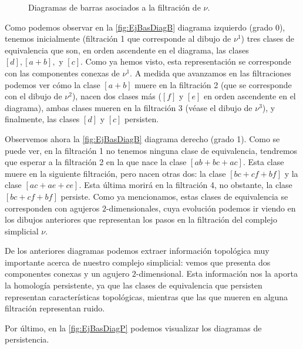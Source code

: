\documentclass[12pt, a4paper, twoside]{book}
\numberwithin{equation}{section}
\theoremstyle{definition}
\newenvironment{ejem}
  {\pushQED{\qed}\renewcommand{\qedsymbol}{$\blacktriangleleft$}\ejemplo}
  {\popQED\endejemplo}
\theoremstyle{remark}
\theoremstyle{plain}
\begin{document}
\begin{ejem}
\begin{figure}[!htbp]
{\begin{figure}[H]
{}
			\end{figure}	
		\endminipage}
		\caption{Diagramas de barras asociados a la filtración de 
		{\Large $\nu$}.}
		\label{fig:EjBasDiagB}
	\end{figure}

	Como podemos observar en la \autoref{fig:EjBasDiagB} diagrama 
	izquierdo (grado 0), 
	tenemos inicialmente (filtración 1 que corresponde al dibujo de 
	{\Large $\nu$}$^{1}$) tres clases de equivalencia que son, en orden 
	ascendente 
	en el diagrama, las clases $[d],[a+b],$ y $[c]$. Como ya hemos visto, 
	esta representación se corresponde con las componentes conexas de 
	{\Large $\nu$}$^{1}$. A medida que avanzamos en las 
	filtraciones podemos ver cómo la clase $[a+b]$ muere en la filtración 
	2
	(que se corresponde con el dibujo de {\Large $\nu$}$^{2}$), nacen dos 
	clases más ($[f]$ y $[e]$ en orden ascendente en el diagrama), ambas 
	clases mueren en la filtración 3 (véase el dibujo de 
	{\Large $\nu$}$^{3}$), y finalmente, las clases $[d]$ y $[c]$ 
	persisten.
	
	Observemos ahora la \autoref{fig:EjBasDiagB} diagrama derecho 
	(grado 1). Como se puede 
	ver, en la filtración 1 no tenemos ninguna clase de equivalencia, 
	tendremos que esperar a la filtración 2 en la que nace la clase 
	$[ab+bc+ac]$. Esta clase muere en la siguiente filtración, pero nacen 
	otras dos: la clase $[bc+cf+bf]$ y la clase $[ac+ae+ce]$. Esta última 
	morirá en la filtración 4, no obstante, la clase $[bc+cf+bf]$ 
	persiste. Como ya mencionamos, estas clases de equivalencia se 
	corresponden con agujeros $2$-dimensionales, cuya evolución podemos ir
	viendo en los dibujos anteriores que representan los pasos en la 
	filtración del complejo simplicial {\Large $\nu$}.

	De los anteriores diagramas podemos extraer información topológica 
	muy importante acerca de nuestro complejo simplicial: vemos que 
	presenta dos componentes conexas y un agujero $2$-dimensional. Esta 
	información nos la aporta la homología persistente, ya que las 
	clases de 
	equivalencia que persisten representan características topológicas, 
	mientras que las que mueren en alguna filtración representan ruido.

	Por último, en la \autoref{fig:EjBasDiagP} podemos visualizar los 
	diagramas de persistencia.
	\begin{figure}[!htbp]
\end{figure}
\end{ejem}
\end{document}
